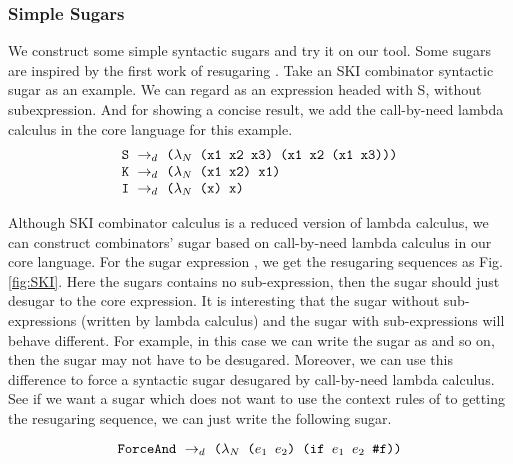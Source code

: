 \subsubsection{Simple Sugars}
\label{mark:simple}

We construct some simple syntactic sugars and try it on our tool. Some sugars are inspired by the first work of resugaring \cite{resugaring}. 
Take an SKI combinator syntactic sugar as an example. We can regard  as an expression headed with S, without subexpression. And for showing a concise result, we add the call-by-need lambda calculus in the core language for this example.
\[
\begin{array}{l}
\mbox{\tt S} ~\rightarrow_d~ \texttt{($\lambda_N$ (x1 x2 x3) (x1 x2 (x1 x3)))}\\
\mbox{\tt K} ~\rightarrow_d~ \texttt{($\lambda_N$ (x1 x2) x1)}\\
\mbox{\tt I} ~\rightarrow_d~ \texttt{($\lambda_N$ (x) x)}
\end{array}
\]




Although SKI combinator calculus is a reduced version of lambda calculus, we can construct combinators' sugar based on call-by-need lambda calculus in our core language. For the sugar expression , we get the resugaring sequences as Fig.  \ref{fig:SKI}. Here the sugars contains no sub-expression, then the sugar should just desugar to the core expression. It is interesting that the sugar without sub-expressions (written by lambda calculus) and the sugar with sub-expressions will behave different. For example, in this case we can write the sugar as  and so on, then the sugar may not have to be desugared. Moreover, we can use this difference to force a syntactic sugar desugared by call-by-need lambda calculus. See if we want a sugar  which does not
want to use the context rules of  to getting the resugaring sequence, we can just write the following sugar.

\[
\texttt{ForceAnd} ~\rightarrow_d~ \texttt{($\lambda_N$ ($e_1$ $e_2$) (if $e_1$ $e_2$ \#f))}
\]





